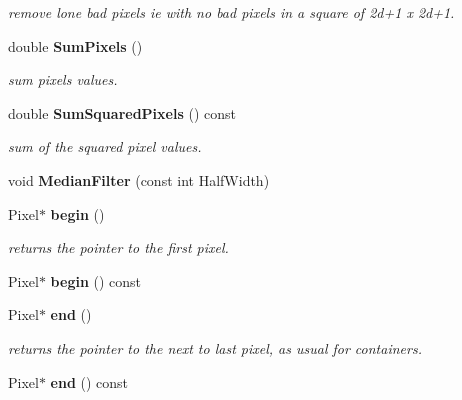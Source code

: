 \begin{CompactItemize}
\begin{CompactList}\small\item\em remove lone bad pixels ie with no bad pixels in a square of 2d+1 x 2d+1.\item\end{CompactList}\item 
{}
double {\bf Sum\-Pixels} ()\label{class_image_a58}

\begin{CompactList}\small\item\em sum pixels values.\item\end{CompactList}\item 
{}
double {\bf Sum\-Squared\-Pixels} () const\label{class_image_a59}

\begin{CompactList}\small\item\em sum of the squared pixel values.\item\end{CompactList}\item 
{}
void {\bf Median\-Filter} (const int Half\-Width)\label{class_image_a60}

\item 
{}
Pixel$\ast$ {\bf begin} ()\label{class_image_a61}

\begin{CompactList}\small\item\em returns the pointer to the first pixel.\item\end{CompactList}\item 
{}
Pixel$\ast$ {\bf begin} () const\label{class_image_a62}

\item 
{}
Pixel$\ast$ {\bf end} ()\label{class_image_a63}

\begin{CompactList}\small\item\em returns the pointer to the next to last pixel, as usual for containers.\item\end{CompactList}\item 
{}
Pixel$\ast$ {\bf end} () const\label{class_image_a64}


\end{CompactItemize}
